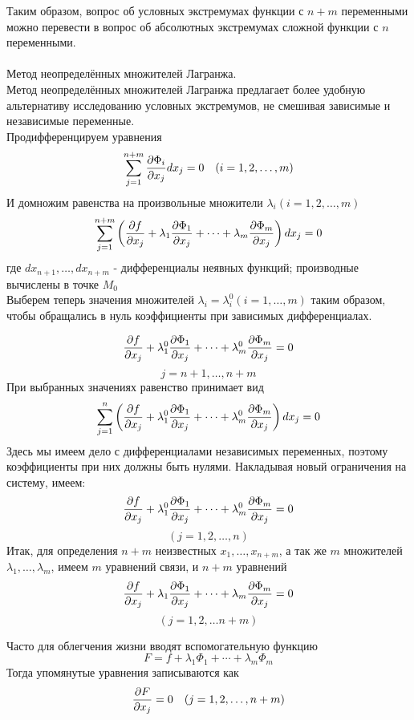 Таким образом, вопрос об условных экстремумах функции с $n+m$ переменными можно перевести в вопрос об абсолютных экстремумах сложной функции с $n$ переменными.\\
\\

Метод неопределённых множителей Лагранжа.\\

Метод неопределённых множителей Лагранжа предлагает более удобную альтернативу исследованию условных экстремумов, не смешивая зависимые и независимые переменные.\\

Продифференцируем уравнения
$$\sum_{j = 1}^{n+m} {\partial \Phi_i \over \partial x_j}dx_j = 0 
\quad (i = 1,2,\dotsc,m)$$
И домножим равенства на произвольные множители $\lambda_i (i = 1,2,\dotsc,m)$
$$\sum_{j=1}^{n+m}\left(
{\partial f \over \partial x_j} + 
\lambda_1{\partial \Phi_1 \over \partial x_j} +
\dotsb +
\lambda_m{\partial \Phi_m \over \partial x_j} \right)dx_j
=0
$$
где $dx_{n+1}, \dotsc, dx_{n+m}$ - дифференциалы неявных функций; производные вычислены в точке $M_0$\\

Выберем теперь значения множителей $\lambda_i = \lambda_i^0 (i = 1, \dotsc, m)$ таким образом, чтобы обращались в нуль коэффициенты при зависимых дифференциалах.

$$
{\partial f \over \partial x_j} + 
\lambda_1^0{\partial \Phi_1 \over \partial x_j} +
\dotsb +
\lambda_m^0{\partial \Phi_m \over \partial x_j} = 0
$$
$$j=n+1,\dotsc,n+m$$
При выбранных значениях равенство принимает вид
$$\sum_{j=1}^{n}\left(
{\partial f \over \partial x_j} + 
\lambda_1^0{\partial \Phi_1 \over \partial x_j} +
\dotsb +
\lambda_m^0{\partial \Phi_m \over \partial x_j} \right)dx_j
= 0
$$
Здесь мы имеем дело с дифференциалами независимых переменных, поэтому коэффициенты
при них должны быть нулями. Накладывая новый ограничения на систему, имеем:
$$
{\partial f \over \partial x_j} +
\lambda_1^0{\partial \Phi_1 \over \partial x_j} +
\dotsb +
\lambda_m^0{\partial \Phi_m \over \partial x_j} = 0
$$
$$(j = 1, 2, \dotsc, n)$$
Итак, для определения $n+m$ неизвестных $x_1, \dotsc, x_{n+m}$, а так же $m$ множителей $\lambda_1,\dotsc, \lambda_m$, имеем $m$ уравнений связи, и $n+m$ уравнений
$$
{\partial f \over \partial x_j} +
\lambda_1{\partial \Phi_1 \over \partial x_j} +
\dotsb +
\lambda_m{\partial \Phi_m \over \partial x_j} = 0
$$
$$(j = 1, 2, \dotsc n+m)$$

Часто для облегчения жизни вводят вспомогательную функцию
$$F = f + 
\lambda_1\Phi_1 + 
\dotsb + 
\lambda_m\Phi_m
$$
Тогда упомянутые уравнения записываются как
$${\partial F \over \partial x_j} = 0 \quad (j = 1, 2, \dotsc, n+m)$$

